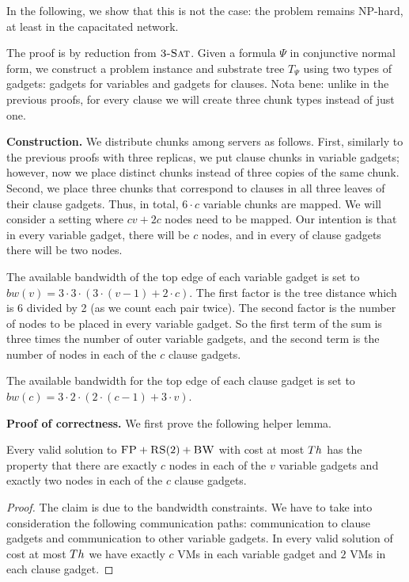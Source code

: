 In the following, we show that this is not the case: the problem remains
NP-hard, at least in the capacitated network. 

The proof is by reduction from $\textsc{3-Sat}$. Given a formula $\Psi$ in
conjunctive normal form, we construct a problem instance and substrate tree 
$T_{\Psi}$ using two types of gadgets: gadgets for variables and
gadgets for clauses. Nota bene: 
unlike in the previous proofs, for every clause we will create three chunk types instead of just one.

\textbf{Construction.}
We distribute chunks among servers as follows. First, 
similarly to the previous proofs with three replicas, we put clause chunks in
variable gadgets; however, now we place distinct chunks instead of
three copies of the same chunk. Second, we place three chunks that
correspond to clauses in all three leaves of their clause gadgets. 
Thus, in total, $6 \cdot c$ variable chunks are mapped.
We will consider a setting where $cv + 2c$ nodes need to be mapped. Our intention is that in
every variable gadget, there will be $c$ nodes,
 and in every of clause
gadgets there will be two nodes.

The available bandwidth of the top edge of each variable gadget is set to
$ bw(v) = 3  \cdot  3  \cdot  (3  \cdot  (v - 1) + 2  \cdot  c) $.
The first factor is the tree distance which is 6 divided by 2 (as
we count each pair twice). The second factor is
the number of nodes to be placed in every variable gadget. 
So the first term of the 
sum is three times the number of outer variable gadgets,
and the second term is the
number of nodes in each of the $c$ clause gadgets.

The available bandwidth for the top edge of each clause gadget is set to
$ bw(c) = 3  \cdot  2  \cdot  (2  \cdot  (c - 1) + 3  \cdot  v) $.

\textbf{Proof of correctness.}
We first prove the following helper lemma.
\begin{lemma}
Every valid solution to $\textsc{FP}+\textsc{RS}(2)+\textsc{BW}$
with cost at most $Th$ has the property that
there are exactly $c$ nodes in each of the $v$ variable gadgets
and exactly two nodes in each of the $c$ clause gadgets.
\end{lemma}
\begin{proof}
The claim is due to the bandwidth constraints. We have to take into
consideration the following communication paths: 
communication to clause gadgets and 
communication to
other variable gadgets. 
In every valid solution of cost at most $Th$ we have exactly
$c$ VMs in each variable gadget and $2$ VMs in each clause gadget.
\end{proof}

